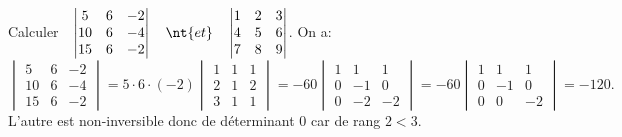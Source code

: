 \documentclass[11pt]{article}
\begin{document}
\begin{ex}{}{}
    Calculer$\quad \begin{vmatrix}
        5 & 6 & -2 \\
        10 & 6 & -4 \\
        15 & 6 & -2
    \end{vmatrix}
    \quad \nt{et} \quad
    \begin{vmatrix}
        1 & 2 & 3 \\
        4 & 5 & 6 \\
        7 & 8 & 9
    \end{vmatrix}$.
    \tcblower
    On a:
    \begin{equation*}
        \begin{vmatrix}
            5 & 6 & -2 \\
            10 & 6 & -4 \\
            15 & 6 & -2
        \end{vmatrix}
        =5\cdot6\cdot(-2)\begin{vmatrix}
            1&1&1\\
            2&1&2\\
            3&1&1
        \end{vmatrix}
        =-60\begin{vmatrix}
            1&1&1\\
            0&-1&0\\
            0&-2&-2
        \end{vmatrix}
        =-60\begin{vmatrix}
            1&1&1\\
            0&-1&0\\
            0&0&-2
        \end{vmatrix}=-120.
    \end{equation*}
    L'autre est non-inversible donc de déterminant 0 car de rang $2<3$. 
\end{ex}
\end{document}
